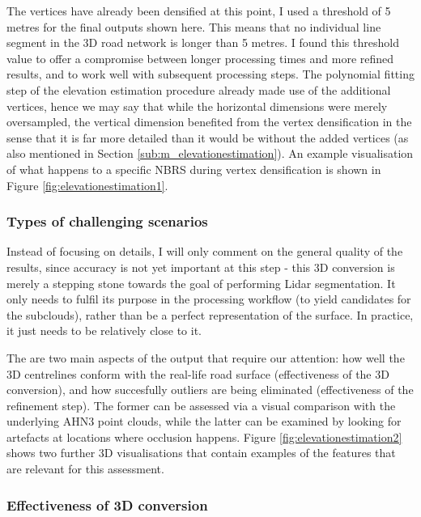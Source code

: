 The vertices have already been densified at this point, I used a threshold of 5 metres for the final outputs shown here. This means that no individual line segment in the 3D road network is longer than 5 metres. I found this threshold value to offer a compromise between longer processing times and more refined results, and to work well with subsequent processing steps. The polynomial fitting step of the elevation estimation procedure already made use of the additional vertices, hence we may say that while the horizontal dimensions were merely oversampled, the vertical dimension benefited from the vertex densification in the sense that it is far more detailed than it would be without the added vertices (as also mentioned in Section \ref{sub:m_elevationestimation}). An example visualisation of what happens to a specific NBRS during vertex densification is shown in Figure \ref{fig:elevationestimation1}.

\subsubsection{Types of challenging scenarios}

Instead of focusing on details, I will only comment on the general quality of the results, since accuracy is not yet important at this step - this 3D conversion is merely a stepping stone towards the goal of performing Lidar segmentation. It only needs to fulfil its purpose in the processing workflow (to yield candidates for the subclouds), rather than be a perfect representation of the surface. In practice, it just needs to be relatively close to it.

The are two main aspects of the output that require our attention: how well the 3D centrelines conform with the real-life road surface (effectiveness of the 3D conversion), and how succesfully outliers are being eliminated (effectiveness of the refinement step). The former can be assessed via a visual comparison with the underlying AHN3 point clouds, while the latter can be examined by looking for artefacts at locations where occlusion happens. Figure \ref{fig:elevationestimation2} shows two further 3D visualisations that contain examples of the features that are relevant for this assessment.

\subsubsection{Effectiveness of 3D conversion}

